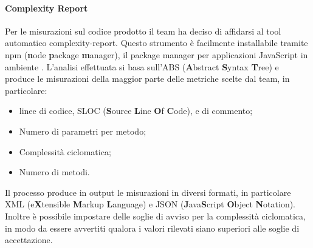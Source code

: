 \paragraph{Complexity Report}
Per le misurazioni sul codice prodotto il team ha deciso di affidarsi al tool automatico complexity-report. Questo strumento è facilmente installabile tramite npm (\textbf{n}ode \textbf{p}ackage \textbf{m}anager), il package manager per applicazioni JavaScript in ambiente . L'analisi effettuata si basa sull'ABS (\textbf{A}bstract \textbf{S}yntax \textbf{T}ree) e produce le misurazioni della maggior parte delle metriche scelte dal team, in particolare:
\begin{itemize}
\item linee di codice, SLOC (\textbf{S}ource \textbf{L}ine \textbf{O}f \textbf{C}ode), e di commento;
\item Numero di parametri per metodo;
\item Complessità ciclomatica;
\item Numero di metodi.
\end{itemize}
Il processo produce in output le misurazioni in diversi formati, in particolare XML (e\textbf{X}tensible \textbf{M}arkup \textbf{L}anguage) e JSON (\textbf{J}ava\textbf{S}cript \textbf{O}bject \textbf{N}otation). Inoltre è possibile impostare delle soglie di avviso per la complessità ciclomatica, in modo da essere avvertiti qualora i valori rilevati siano superiori alle soglie di accettazione.
